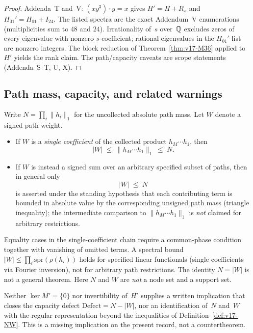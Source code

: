 \begin{proof}
Addenda~T and~V: $(xy^3)\cdot y=x$ gives $H'=H+R_x$ and $H_{01}'=H_{01}+I_{24}$. The listed spectra are the exact Addendum~V enumerations (multiplicities sum to $48$ and $24$). Irrationality of~$s$ over~$\mathbb{Q}$ excludes zeros of every eigenvalue with nonzero $s$-coefficient; rational eigenvalues in the $H_{01}'$ list are nonzero integers. The block reduction of Theorem~\ref{thm:v17-M36} applied to~$H'$ yields the rank claim. The path/capacity caveats are scope statements (Addenda~S--T, U, X).
\end{proof}

\subsection{Path mass, capacity, and related warnings}
\begin{definition}\label{def:v17-NW}
Write $N=\prod_i\|h_i\|_1$ for the uncollected absolute path mass. Let $W$ denote a signed path weight.
\begin{itemize}
\item If $W$ is a \emph{single coefficient} of the collected product $h_M\cdots h_1$, then
\[
|W|\;\le\;\|h_M\cdots h_1\|_1\;\le\; N.
\]
\item If $W$ is instead a signed sum over an arbitrary specified subset of paths, then in general only
\[
|W|\;\le\; N
\]
is asserted under the standing hypothesis that each contributing term is bounded in absolute value by the corresponding unsigned path mass (triangle inequality); the intermediate comparison to $\|h_M\cdots h_1\|_1$ is \emph{not} claimed for arbitrary restrictions.
\end{itemize}
Equality cases in the single-coefficient chain require a common-phase condition together with vanishing of omitted terms. A spectral bound $|W|\le\prod_i\mathrm{spr}(\rho(h_i))$ holds for specified linear functionals (single coefficients via Fourier inversion), not for arbitrary path restrictions. The identity $N=|W|$ is not a general theorem. Here $N$ and $W$ are \emph{not} a node set and a support set.
\end{definition}

\begin{remark}\label{rem:v17-capacity-open}
Neither $\ker M'=\{0\}$ nor invertibility of~$H'$ supplies a written implication that closes the capacity defect $\mathrm{Defect}=N-|W|$, nor an identification of~$N$ and~$W$ with the regular representation beyond the inequalities of Definition~\ref{def:v17-NW}. This is a missing implication on the present record, not a countertheorem.
\end{remark}

